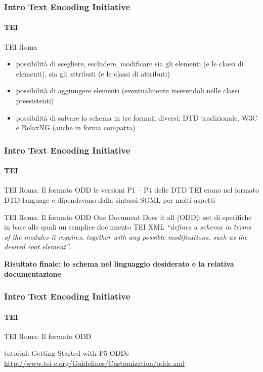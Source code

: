 \begin{frame}
	\frametitle{Intro Text Encoding Initiative}
	\framesubtitle{TEI}
	\addtocounter{nframe}{1}

	\begin{block}{TEI Roma}

		\begin{itemize}
			\item  possibilità di scegliere, escludere, modificare sia gli elementi (e le classi di elementi), sia gli attributi (e le classi di attributi)
			\item possibilità di aggiungere elementi (eventualmente inserendoli nelle classi preesistenti)
			\item possibilità di salvare lo schema in tre formati diversi: DTD  tradizionale, W3C e RelaxNG (anche in forma compatta)
		\end{itemize}

	\end{block}


\end{frame}


\begin{frame}
	\frametitle{Intro Text Encoding Initiative}
	\framesubtitle{TEI}
	\addtocounter{nframe}{1}

	\begin{block}{TEI Roma: Il formato ODD}
		le versioni P1 – P4 delle DTD TEI erano nel formato DTD language e dipendevano dalla sintassi SGML per molti aspetti
	\end{block}

	\begin{block}{TEI Roma: Il formato ODD}
		One Document Does it all (ODD): set di specifiche in base alle quali un semplice documento TEI XML \textit{“defines a schema in terms of the modules it requires, together with any possible modifications, such as the desired
        root element”}. 
    \end{block}
    
    \textbf{Risultato finale: lo schema nel linguaggio desiderato e la relativa documentazione}

\end{frame}


\begin{frame}
	\frametitle{Intro Text Encoding Initiative}
	\framesubtitle{TEI}
	\addtocounter{nframe}{1}

	\begin{block}{TEI Roma: Il formato ODD}

		tutorial: Getting Started with P5 ODDs\\
		\url{http://www.tei-c.org/Guidelines/Customization/odds.xml}

	\end{block}


\end{frame}


